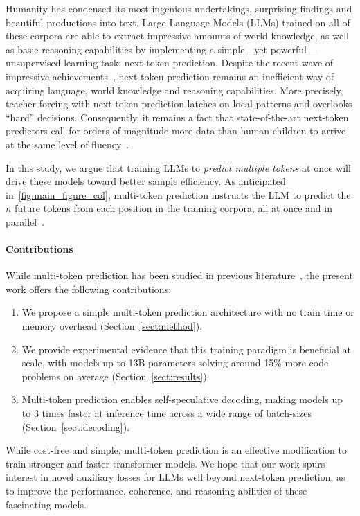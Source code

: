 Humanity has condensed its most ingenious undertakings, surprising findings and beautiful productions into text.
Large Language Models (LLMs) trained on all of these corpora are able to extract impressive amounts of world knowledge, as well as basic reasoning capabilities by implementing a simple---yet powerful---unsupervised learning task: next-token prediction.
Despite the recent wave of impressive achievements~\citep{openai2023gpt4}, next-token prediction remains an inefficient way of acquiring language, world knowledge and reasoning capabilities.
More precisely, teacher forcing with next-token prediction latches on local patterns and overlooks ``hard'' decisions. 
Consequently, it remains a fact that state-of-the-art next-token predictors call for orders of magnitude more data than human children to arrive at the same level of fluency~\citep{frank2023bridging}.

\vspace{0.2em}





In this study, we argue that training LLMs to \emph{predict multiple tokens} at once will drive these models toward better sample efficiency.
As anticipated in~\cref{fig:main_figure_col}, multi-token prediction instructs the LLM to predict the $n$ future tokens from each position in the training corpora, all at once and in parallel~\citep{qi2020prophetnet}.



\paragraph{Contributions}
While multi-token prediction has been studied in previous literature~\citep{qi2020prophetnet}, the present work offers the following contributions:
\begin{enumerate}
  \item We propose a simple multi-token prediction architecture with no train time or memory overhead (Section~\ref{sect:method}).
  \item We provide experimental evidence that this training paradigm is beneficial at scale, with models up to 13B parameters solving around 15\% more code problems on average (Section~\ref{sect:results}).
  \item Multi-token prediction enables self-speculative decoding, making models up to 3 times faster at inference time across a wide range of batch-sizes (Section~\ref{sect:decoding}).
\end{enumerate}


While cost-free and simple, multi-token prediction is an effective modification to train stronger and faster transformer models.
We hope that our work spurs interest in novel auxiliary losses for LLMs well beyond next-token prediction, as to improve the performance, coherence, and reasoning abilities of these fascinating models.

